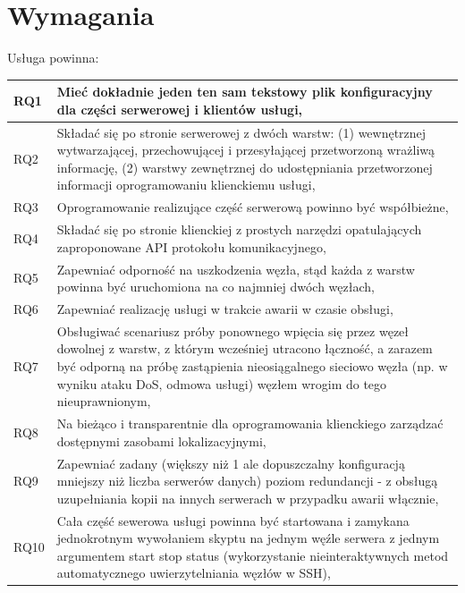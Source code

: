 \documentclass[11pt]{article}
\begin{document}
\section{Wymagania}

Usługa powinna:

\begin{tabular}{ l p{10cm} }
  \hline
  RQ1 & Mieć dokładnie jeden ten sam tekstowy plik konfiguracyjny dla części
    serwerowej i klientów usługi, \\ \hline
  RQ2 & Składać się po stronie serwerowej z dwóch warstw: (1)  wewnętrznej 
    wytwarzającej, przechowującej i przesyłającej przetworzoną wrażliwą
    informację, (2) warstwy zewnętrznej do udostępniania przetworzonej informacji
    oprogramowaniu klienckiemu usługi, \\ \hline
  RQ3 & Oprogramowanie realizujące część serwerową powinno być współbieżne, \\
    \hline
  RQ4 & Składać się po stronie klienckiej z prostych narzędzi opatulających
    zaproponowane API protokołu komunikacyjnego, \\ \hline
  RQ5 & Zapewniać odporność na uszkodzenia węzła, stąd każda z warstw powinna być
    uruchomiona na co najmniej dwóch węzłach, \\ \hline
  RQ6 & Zapewniać realizację usługi w trakcie awarii w czasie obsługi, \\ \hline
  RQ7 & Obsługiwać scenariusz próby ponownego wpięcia się przez węzeł dowolnej z
    warstw, z którym wcześniej utracono łączność, a zarazem być odporną na próbę
    zastąpienia nieosiągalnego sieciowo węzła (np. w wyniku ataku DoS, odmowa
    usługi) węzłem wrogim do tego nieuprawnionym, \\ \hline
  RQ8 & Na bieżąco i transparentnie dla oprogramowania klienckiego zarządzać
    dostępnymi zasobami lokalizacyjnymi, \\ \hline
  RQ9 & Zapewniać zadany (większy niż 1 ale dopuszczalny konfiguracją mniejszy niż
    liczba serwerów danych) poziom redundancji - z obsługą uzupełniania kopii na
    innych serwerach w przypadku awarii włącznie, \\ \hline
  RQ10 & Cała część sewerowa usługi powinna być startowana i zamykana jednokrotnym
    wywołaniem skyptu na jednym węźle serwera z jednym argumentem
    \textlangle{} start \textbar{} stop \textbar{} status \textrangle{}
    (wykorzystanie nieinteraktywnych metod automatycznego uwierzytelniania
    węzłów w SSH), \\ \hline
\end{tabular}
 
\end{document}
